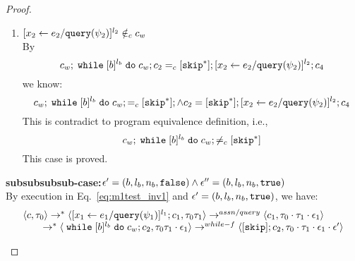 {\begin{proof}
\begin{subproof}
\begin{enumerate}
 \\
 If $[\assign{{x}_2}{\expr_2 / \query(\qexpr_2)}]^{l_2} \notin_c c_2$,
 Then we know $\forall \trace, \trace' \in \mathcal{T}$, there doesn't exist execution
 \[
  \config{[\eskip]^{l_b};c_2, \vtrace} \rightarrow^{*} 
  \config{[\assign{{x}_2}{\expr_2 / \query(\qexpr_2)}]^{l_2};{c}_4', \trace'}
 \]
 This is contradict to the existence of execution in Eq.\ref{eq:m1testif_inv2}.
 \\
  If $[\assign{{x}_2}{\expr_2 / \query(\qexpr_2)}]^{l_2} \in_c c_2$, there must exist another while command
   in $c_2$ such that 
  $\ewhile [b]^{l_b} \edo c_w \in c_{w2}$ and $[\assign{{x}_2}{\expr_2 / \query(\qexpr_2)}]^{l_2} \in_c c_w$.
  \\
  We know $[\assign{{x}_2}{\expr_2 / \query(\qexpr_2)}]^{l_2}$ will only shows up in $c_w$.
  \\
  By $\flowsto$ definition, we have:
  \[
    \forall z_i^{r_i} \in \lvar_{c_w}, x_j^{l_j} \in VAR(b) \st
    \flowsto(x_j^{l_j}, z_i^{r_i})
  \]
  Since $x_2^{l_2} \in \lvar_{c_w}$ by $\flowsto$ definition, we have: 
  \[
    \flowsto(x_1^{l_1}, x_2^{l_2})
  \]
  This case is proved.
 \item $[\mathrel{ {x}_2 \leftarrow e_2 / {\tt query}(\psi_2) }]^{l_2} \notin_c c_w$
 \\
 By
 \[
  c_w;\;\mathtt{while}\; [b]^{l_b} \;\mathtt{do}\; c_w; c_2 =_c [\mathtt{skip}^*]; [\mathrel{ {x}_2 \leftarrow e_2 / {\tt query}(\psi_2) }]^{l_2};{c}_4
\]
we know:
\[
  c_w;\;\mathtt{while}\; [b]^{l_b} \;\mathtt{do}\; c_w; =_c [\mathtt{skip}^*]; \land c_2 = [\mathtt{skip}^*]; [\mathrel{ {x}_2 \leftarrow e_2 / {\tt query}(\psi_2) }]^{l_2};{c}_4
\]
This is contradict to program equivalence definition, i.e.,
\[
  c_w;\;\mathtt{while}\; [b]^{l_b} \;\mathtt{do}\; c_w; \neq_c [\mathtt{skip}^*]
\]
This case is proved.
%
 \end{enumerate}
%
\textbf{subsubsubsub-case:}$\mathtt{\epsilon}' = (b, l_b, n_b, \mathtt{false}) \land \mathtt{\epsilon}'' = (b, l_b, n_b, \mathtt{true})$
\\
By execution in Eq.~\ref{eq:m1test_inv1} and $\mathtt{\epsilon}' = (b, l_b, n_b, \mathtt{true})$, we have:
\[
  \begin{array}{l}   
  \langle {c}, \mathtt{\tau}_0 \rangle \rightarrow^{*} 
  \langle [\mathrel{ {x}_1 \leftarrow e_1 / {\tt query}(\psi_1) }]^{l_1} ; {c}_1, \mathtt{\tau}_0 \mathtt{\tau}_1 \rangle  
  \rightarrow^{assn/query}
  \langle c_1, \mathtt{\tau}_0 \cdot \mathtt{\tau}_1 \cdot \mathtt{\epsilon}_1 \rangle 
  \\
  \qquad \rightarrow^{*} 
  \langle \;\mathtt{while}\; [b]^{l_b} \;\mathtt{do}\; c_w;{c}_2, 
  \mathtt{\tau}_0 \mathtt{\tau}_1 \cdot \mathtt{\epsilon}_1 \rangle 
  \rightarrow^{while-f} 
  \langle [\mathtt{skip}]; c_2, \mathtt{\tau}_0 \cdot \mathtt{\tau}_1 \cdot \mathtt{\epsilon}_1 \cdot \mathtt{\epsilon}' \rangle 
  \\

\end{array}\]
\end{subproof}
\end{proof}}
